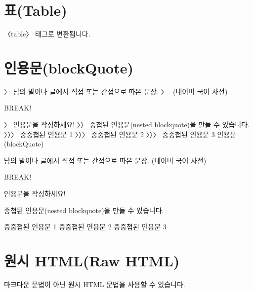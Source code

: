 \documentclass[12pt, a4paper, oneside]{book}
\let\stdsection\section
\renewcommand\section{\newpage\stdsection}
\begin{document}
				\section{표(Table)}
				
					〈table〉 태그로 변환됩니다.
%					
%					
				
				\section{인용문(blockQuote)}
			
					〉 남의 말이나 글에서 직접 또는 간접으로 따온 문장.
					〉\_(네이버 국어 사전)\_
					
					BREAK!
					
					〉 인용문을 작성하세요!
					〉〉 중첩된 인용문(nested blockquote)을 만들 수 있습니다.
					〉〉〉 중중첩된 인용문 1
					〉〉〉 중중첩된 인용문 2
					〉〉〉 중중첩된 인용문 3
					인용문(blockQuote)
					
					남의 말이나 글에서 직접 또는 간접으로 따온 문장.
					(네이버 국어 사전)
					
					BREAK!
					
					인용문을 작성하세요!
					
					중첩된 인용문(nested blockquote)을 만들 수 있습니다.
					
					중중첩된 인용문 1
					중중첩된 인용문 2
					중중첩된 인용문 3
					
				\section{원시 HTML(Raw HTML)}
					마크다운 문법이 아닌 원시 HTML 문법을 사용할 수 있습니다.
					
\end{document}
